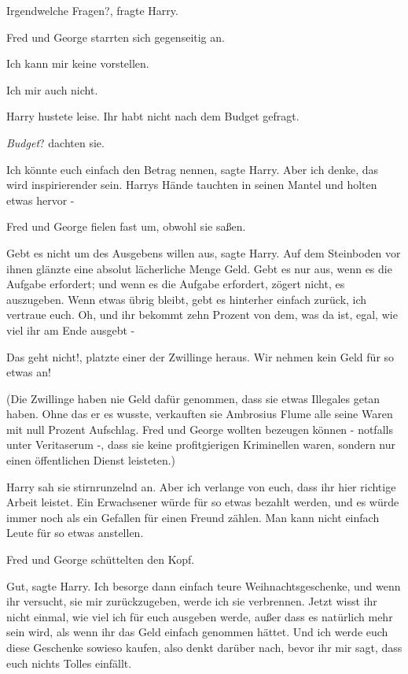 \glqq{}Irgendwelche Fragen?\grqq{}, fragte Harry.

Fred und George starrten sich gegenseitig an.

\glqq{}Ich kann mir keine vorstellen.\grqq{}

\glqq{}Ich mir auch nicht.\grqq{}

Harry hustete leise. \glqq{}Ihr habt nicht nach dem Budget gefragt.\grqq{}

\emph{Budget}? dachten sie.

\glqq{}Ich könnte euch einfach den Betrag nennen\grqq{}, sagte Harry.
\glqq{}Aber ich denke, das wird inspirierender sein.\grqq{} Harrys Hände
tauchten in seinen Mantel und holten etwas hervor -

Fred und George fielen fast um, obwohl sie saßen.

\glqq{}Gebt es nicht um des Ausgebens willen aus\grqq{}, sagte Harry. Auf dem
Steinboden vor ihnen glänzte eine absolut lächerliche Menge Geld. \glqq{}Gebt es
nur aus, wenn es die Aufgabe erfordert; und wenn es die Aufgabe erfordert,
zögert nicht, es auszugeben. Wenn etwas übrig bleibt, gebt es hinterher einfach
zurück, ich vertraue euch. Oh, und ihr bekommt zehn Prozent von dem, was da ist,
egal, wie viel ihr am Ende ausgebt -\grqq{}

\glqq{}Das geht nicht!\grqq{}, platzte einer der Zwillinge heraus. \glqq{}Wir
nehmen kein Geld für so etwas an!\grqq{}

(Die Zwillinge haben nie Geld dafür genommen, dass sie etwas Illegales getan
haben. Ohne das er es wusste, verkauften sie Ambrosius Flume alle seine Waren
mit null Prozent Aufschlag. Fred und George wollten bezeugen können - notfalls
unter Veritaserum -, dass sie keine profitgierigen Kriminellen waren, sondern
nur einen öffentlichen Dienst leisteten.)

Harry sah sie stirnrunzelnd an. \glqq{}Aber ich verlange von euch, dass ihr hier
richtige Arbeit leistet. Ein Erwachsener würde für so etwas bezahlt werden, und
es würde immer noch als ein Gefallen für einen Freund zählen. Man kann nicht
einfach Leute für so etwas anstellen.\grqq{}

Fred und George schüttelten den Kopf.

\glqq{}Gut\grqq{}, sagte Harry. \glqq{}Ich besorge dann einfach teure
Weihnachtsgeschenke, und wenn ihr versucht, sie mir zurückzugeben, werde ich sie
verbrennen. Jetzt wisst ihr nicht einmal, wie viel ich für euch ausgeben werde,
außer dass es natürlich mehr sein wird, als wenn ihr das Geld einfach genommen
hättet. Und ich werde euch diese Geschenke sowieso kaufen, also denkt darüber
nach, bevor ihr mir sagt, dass euch nichts Tolles einfällt.\grqq{}

